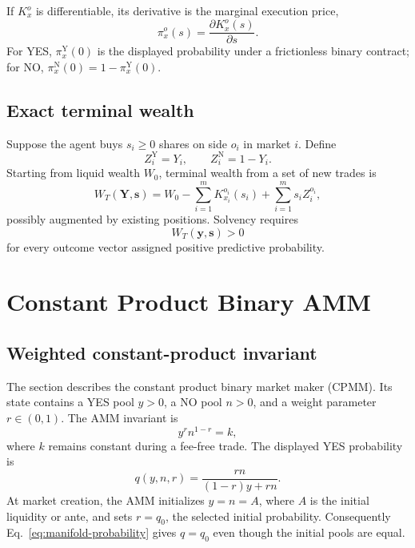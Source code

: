\documentclass[journal, a4paper]{IEEEtran}
\begin{document}
If $K_x^o$ is differentiable, its derivative is the marginal execution price,
\begin{equation}
\pi_x^o(s)=\frac{\partial K_x^o(s)}{\partial s}.
\label{eq:marginal-price-general}
\end{equation}
For YES, $\pi_x^{\mathrm{Y}}(0)$ is the displayed probability under a frictionless binary contract; for NO, $\pi_x^{\mathrm{N}}(0)=1-\pi_x^{\mathrm{Y}}(0)$.

\subsection{Exact terminal wealth}
Suppose the agent buys $s_i\geq0$ shares on side $o_i$ in market $i$. Define
\begin{equation}
Z_i^{\mathrm{Y}}=Y_i,
\qquad
Z_i^{\mathrm{N}}=1-Y_i.
\end{equation}
Starting from liquid wealth $W_0$, terminal wealth from a set of new trades is
\begin{equation}
W_T(\boldsymbol{Y},\boldsymbol{s})
=
W_0-
\sum_{i=1}^{m}K_{x_i}^{o_i}(s_i)
+
\sum_{i=1}^{m}s_i Z_i^{o_i},
\label{eq:terminal-wealth-general}
\end{equation}
possibly augmented by existing positions. Solvency requires
\begin{equation}
W_T(\boldsymbol{y},\boldsymbol{s})>0
\end{equation}
for every outcome vector assigned positive predictive probability.

\section{Constant Product Binary AMM}
\subsection{Weighted constant-product invariant}
The section describes the constant product binary market maker (CPMM). Its state contains a YES pool $y>0$, a NO pool $n>0$, and a weight parameter $r\in(0,1)$.
The AMM invariant is
\begin{equation}
y^{r}n^{1-r}=k,
\label{eq:manifold-invariant}
\end{equation}
where $k$ remains constant during a fee-free trade. The displayed YES probability is
\begin{equation}
q(y,n,r)
=
\frac{r n}{(1-r)y+r n}.
\label{eq:manifold-probability}
\end{equation}
At market creation, the AMM initializes $y=n=A$, where $A$ is the initial liquidity or ante, and sets $r=q_0$, the selected initial probability. Consequently Eq.~\eqref{eq:manifold-probability} gives $q=q_0$ even though the initial pools are equal.
\end{document}
